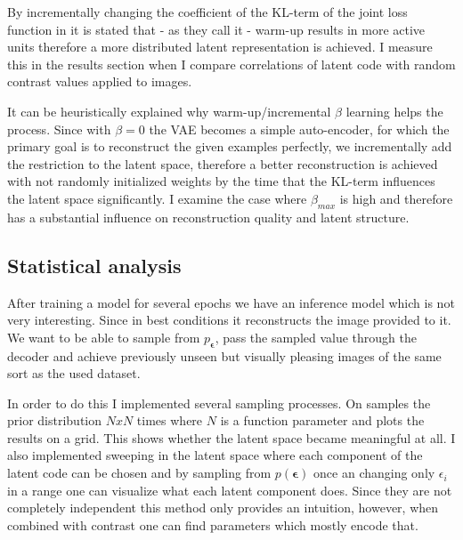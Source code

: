 \documentclass[12pt, english]{article}
\begin{document}
\vspace{5mm}

\par By incrementally changing the coefficient of the KL-term of the joint loss function in \cite{sonderby2016ladder} it is stated that - as they call it - warm-up results in more active units therefore a more distributed latent representation is achieved. I measure this in the results section when I compare correlations of latent code with random contrast values applied to images.

\vspace{4mm}

\par It can be heuristically explained why warm-up/incremental $\beta$ learning helps the process. Since with $\beta = 0$ the VAE becomes a simple auto-encoder, for which the primary goal is to reconstruct the given examples perfectly, we incrementally add the restriction to the latent space, therefore a better reconstruction is achieved with not randomly initialized weights by the time that the KL-term influences the latent space significantly. I examine the case where $\beta_{max}$ is high and therefore has a substantial influence on reconstruction quality and latent structure.

\vspace{5mm}

\subsection{Statistical analysis}

\vspace{5mm}

\par After training a model for several epochs we have an inference model which is not very interesting. Since in best conditions it reconstructs the image provided to it. We want to be able to sample from $p_{\bm{\epsilon}}$, pass the sampled value through the decoder and achieve previously unseen but visually pleasing images of the same sort as the used dataset. 

\vspace{4mm}

\par In order to do this I implemented several sampling processes. On samples the prior distribution $N x N$ times where $N$ is a function parameter and plots the results on a grid. This shows whether the latent space became meaningful at all. I also implemented sweeping in the latent space where each component of the latent code can be chosen and by sampling from $p(\bm{\epsilon})$ once an changing only $\epsilon_{i}$ in a range one can visualize what each latent component does. Since they are not completely independent this method only provides an intuition, however, when combined with contrast one can find parameters which mostly encode that.
\end{document}
